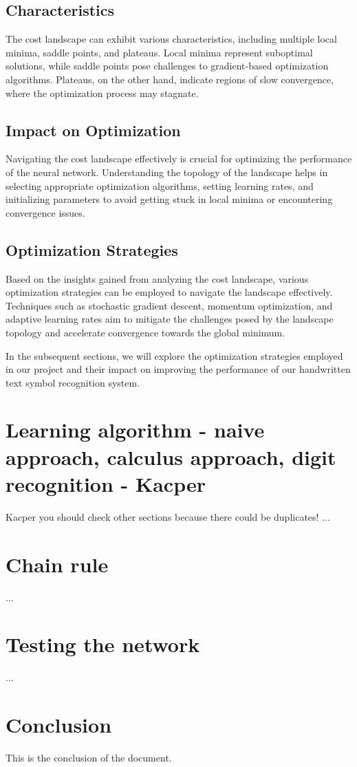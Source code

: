 \documentclass{article}
\begin{document}
\subsection{Characteristics}
The cost landscape can exhibit various characteristics, including multiple local minima, saddle points, and plateaus. Local minima represent suboptimal solutions, while saddle points pose challenges to gradient-based optimization algorithms. Plateaus, on the other hand, indicate regions of slow convergence, where the optimization process may stagnate.

\subsection{Impact on Optimization}
Navigating the cost landscape effectively is crucial for optimizing the performance of the neural network. Understanding the topology of the landscape helps in selecting appropriate optimization algorithms, setting learning rates, and initializing parameters to avoid getting stuck in local minima or encountering convergence issues.

\subsection{Optimization Strategies}
Based on the insights gained from analyzing the cost landscape, various optimization strategies can be employed to navigate the landscape effectively. Techniques such as stochastic gradient descent, momentum optimization, and adaptive learning rates aim to mitigate the challenges posed by the landscape topology and accelerate convergence towards the global minimum.

In the subsequent sections, we will explore the optimization strategies employed in our project and their impact on improving the performance of our handwritten text symbol recognition system.

\newpage
\section{Learning algorithm - naive approach, calculus approach, digit recognition - Kacper}
Kacper you should check other sections because there could be duplicates!
...

\newpage
\section{Chain rule}
...

\newpage
\section{Testing the network}
...

\newpage
\section{Conclusion}
This is the conclusion of the document.

\newpage
\printbibliography 
\end{document}
